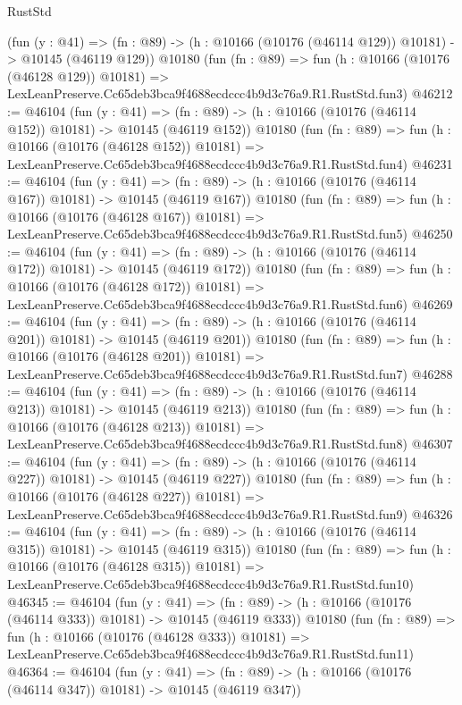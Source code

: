 \begin{lexlean}{RustStd}
\begin{coremodule}
    (fun (y : @41) =>
    (fn : @89) -> (h : @10166 (@10176 (@46114 @129)) @10181) -> @10145 (@46119 @129))
    @10180
    (fun (fn : @89) =>
    fun (h : @10166 (@10176 (@46128 @129)) @10181) =>
    LexLeanPreserve.Cc65deb3bca9f4688ecdccc4b9d3c76a9.R1.RustStd.fun3)
@46212 := @46104
    (fun (y : @41) =>
    (fn : @89) -> (h : @10166 (@10176 (@46114 @152)) @10181) -> @10145 (@46119 @152))
    @10180
    (fun (fn : @89) =>
    fun (h : @10166 (@10176 (@46128 @152)) @10181) =>
    LexLeanPreserve.Cc65deb3bca9f4688ecdccc4b9d3c76a9.R1.RustStd.fun4)
@46231 := @46104
    (fun (y : @41) =>
    (fn : @89) -> (h : @10166 (@10176 (@46114 @167)) @10181) -> @10145 (@46119 @167))
    @10180
    (fun (fn : @89) =>
    fun (h : @10166 (@10176 (@46128 @167)) @10181) =>
    LexLeanPreserve.Cc65deb3bca9f4688ecdccc4b9d3c76a9.R1.RustStd.fun5)
@46250 := @46104
    (fun (y : @41) =>
    (fn : @89) -> (h : @10166 (@10176 (@46114 @172)) @10181) -> @10145 (@46119 @172))
    @10180
    (fun (fn : @89) =>
    fun (h : @10166 (@10176 (@46128 @172)) @10181) =>
    LexLeanPreserve.Cc65deb3bca9f4688ecdccc4b9d3c76a9.R1.RustStd.fun6)
@46269 := @46104
    (fun (y : @41) =>
    (fn : @89) -> (h : @10166 (@10176 (@46114 @201)) @10181) -> @10145 (@46119 @201))
    @10180
    (fun (fn : @89) =>
    fun (h : @10166 (@10176 (@46128 @201)) @10181) =>
    LexLeanPreserve.Cc65deb3bca9f4688ecdccc4b9d3c76a9.R1.RustStd.fun7)
@46288 := @46104
    (fun (y : @41) =>
    (fn : @89) -> (h : @10166 (@10176 (@46114 @213)) @10181) -> @10145 (@46119 @213))
    @10180
    (fun (fn : @89) =>
    fun (h : @10166 (@10176 (@46128 @213)) @10181) =>
    LexLeanPreserve.Cc65deb3bca9f4688ecdccc4b9d3c76a9.R1.RustStd.fun8)
@46307 := @46104
    (fun (y : @41) =>
    (fn : @89) -> (h : @10166 (@10176 (@46114 @227)) @10181) -> @10145 (@46119 @227))
    @10180
    (fun (fn : @89) =>
    fun (h : @10166 (@10176 (@46128 @227)) @10181) =>
    LexLeanPreserve.Cc65deb3bca9f4688ecdccc4b9d3c76a9.R1.RustStd.fun9)
@46326 := @46104
    (fun (y : @41) =>
    (fn : @89) -> (h : @10166 (@10176 (@46114 @315)) @10181) -> @10145 (@46119 @315))
    @10180
    (fun (fn : @89) =>
    fun (h : @10166 (@10176 (@46128 @315)) @10181) =>
    LexLeanPreserve.Cc65deb3bca9f4688ecdccc4b9d3c76a9.R1.RustStd.fun10)
@46345 := @46104
    (fun (y : @41) =>
    (fn : @89) -> (h : @10166 (@10176 (@46114 @333)) @10181) -> @10145 (@46119 @333))
    @10180
    (fun (fn : @89) =>
    fun (h : @10166 (@10176 (@46128 @333)) @10181) =>
    LexLeanPreserve.Cc65deb3bca9f4688ecdccc4b9d3c76a9.R1.RustStd.fun11)
@46364 := @46104
    (fun (y : @41) =>
    (fn : @89) -> (h : @10166 (@10176 (@46114 @347)) @10181) -> @10145 (@46119 @347))

\end{coremodule}
\end{lexlean}
